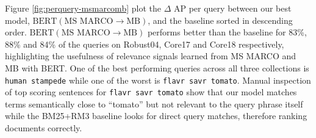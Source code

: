 Figure \ref{fig:perquery-msmarcomb} plot the $\Delta$ AP per query between our best model, $ \textrm{BERT}(\textrm{MS MARCO}\rightarrow\textrm{MB}) $, and the baseline sorted in descending order.
$ \textrm{BERT}(\textrm{MS MARCO}\rightarrow\textrm{MB}) $ performs better than the baseline for 83\%, 88\% and 84\% of the queries on Robust04, Core17 and Core18 respectively, highlighting the usefulness of relevance signals learned from MS MARCO and MB with BERT.
One of the best performing queries across all three collections is \texttt{human stampede} while one of the worst is \texttt{flavr savr tomato}.
Manual inspection of top scoring sentences for \texttt{flavr savr tomato} show that our model matches terms semantically close to ``tomato'' but not relevant to the query phrase itself while the BM25+RM3 baseline looks for direct query matches, therefore ranking documents correctly.



